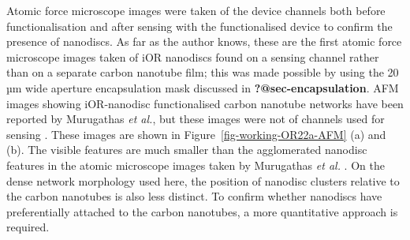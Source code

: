 \documentclass[
  a4paper,
]{scrbook}
\begin{document}
Atomic force microscope images were taken of the device channels both
before functionalisation and after sensing with the functionalised
device to confirm the presence of nanodiscs. As far as the author knows,
these are the first atomic force microscope images taken of iOR
nanodiscs found on a sensing channel rather than on a separate carbon
nanotube film; this was made possible by using the 20 µm wide aperture
encapsulation mask discussed in \textbf{?@sec-encapsulation}. AFM images
showing iOR-nanodisc functionalised carbon nanotube networks have been
reported by Murugathas \emph{et al.}, but these images were not of
channels used for sensing \autocite{Murugathas2019a}. These images are
shown in Figure~\ref{fig-working-OR22a-AFM} (a) and (b). The visible
features are much smaller than the agglomerated nanodisc features in the
atomic microscope images taken by Murugathas \emph{et al.}
\autocite{Murugathas2019a}. On the dense network morphology used here,
the position of nanodisc clusters relative to the carbon nanotubes is
also less distinct. To confirm whether nanodiscs have preferentially
attached to the carbon nanotubes, a more quantitative approach is
required.
\end{document}
